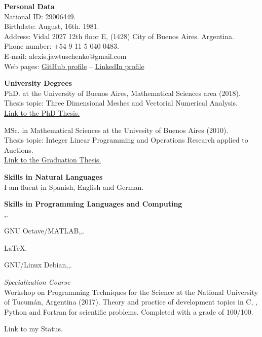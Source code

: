 \textbf{Personal Data}\\[6pt]
National ID: 29006449.\\
Birthdate: August, 16th. 1981.\\
Address: Vidal 2027 12th floor E, (1428) City of Buenos Aires. Argentina.\\
Phone number: +54 9 11 5 040 0483.\\
E-mail: alexis.jawtuschenko@gmail.com\\
Web pages: \href{https://github.com/alexisjawtu}{{\color{blue}GitHub profile}}
-- \href{https://www.linkedin.com/in/alexis-jawtuschenko/}{{\color{blue}LinkedIn profile}}

\textbf{University Degrees}\\[6pt]
PhD. at the University of Buenos Aires, Mathematical Sciences area (2018).\\
Thesis topic: Three Dimensional Meshes and Vectorial Numerical Analysis.\\
\href{https://cms.dm.uba.ar/academico/carreras/doctorado/thesisJawtuschenko.pdf}
{{\color{blue}Link to the PhD Thesis.}}

MSc. in Mathematical Sciences at the Univesity of Buenos Aires (2010).\\
Thesis topic: Integer Linear Programming and Operations Research applied to Auctions.\\
\href{https://cms.dm.uba.ar/academico/carreras/licenciatura/tesis/2010/Jawtuschenko_Alexis.pdf}
{{\color{blue}Link to the Graduation Thesis.}}

\textbf{Skills in Natural Languages}\\[6pt]
I am fluent in Spanish, English and German.

\textbf{Skills in Programming Languages and Computing}\\[6pt]
\Cpp,\;.

{GNU Octave/MATLAB},\;,\;.

{LaTeX}.

{GNU/Linux Debian},\;,\;.

\emph{Specialization Course}\\
Workshop on Programming Techniques for the Science at the National University
of Tucum\'an, Argentina (2017). Theory and practice of development topics in 
C, \Cpp, Python and Fortran for scientific problems. Completed with a grade of 100/100.

Link to my \href{https://projecteuler.net/profile/alexisj.png}
        {\color{blue}{Project Euler}}
Status.


